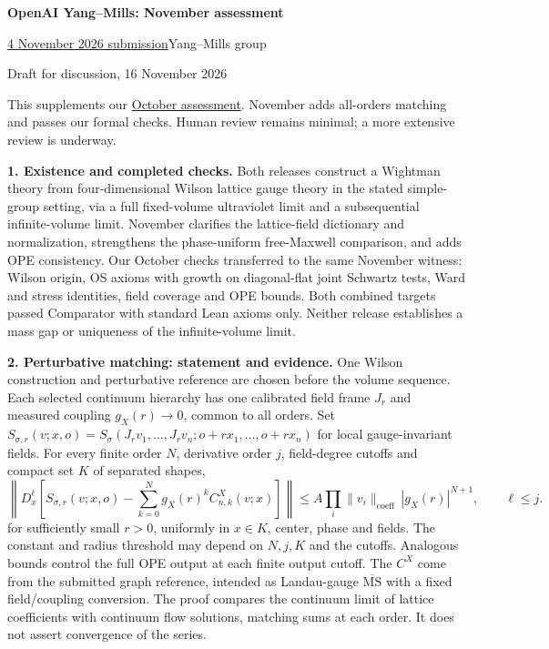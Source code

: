 \documentclass[11pt]{article}
\begin{document}
\begin{center}
{\Large\bfseries OpenAI Yang--Mills: November assessment}\par
\vspace{3pt}
\href{https://github.com/yang-mills-group/OpenAI-YM-20261104/tree/c1bb5a5566b2bad9d593980d470439f815895317/}{4 November 2026 submission}\quad\textbullet\quad Yang--Mills group\par
{\small Draft for discussion, 16 November 2026}
\end{center}
\vspace{-4pt}

This supplements our \href{https://github.com/yang-mills-group/YM/blob/main/docs/assessment-1.pdf}{October assessment}.
November adds all-orders matching and passes our formal checks.
Human review remains minimal; a more extensive review is underway.

\textbf{1. Existence and completed checks.}
Both releases construct a Wightman theory from four-dimensional Wilson lattice
gauge theory in the stated simple-group setting, via a full fixed-volume
ultraviolet limit and a subsequential infinite-volume limit. November clarifies
the lattice-field dictionary and normalization, strengthens the phase-uniform
free-Maxwell comparison, and adds OPE consistency.
Our October checks transferred to the same November witness: Wilson origin,
OS axioms with growth on diagonal-flat joint Schwartz tests, Ward and stress
identities, field coverage and OPE bounds. Both combined targets passed
Comparator with standard Lean axioms only. Neither release establishes a mass
gap or uniqueness of the infinite-volume limit.

\textbf{2. Perturbative matching: statement and evidence.}
One Wilson construction and perturbative reference are chosen before the
volume sequence. Each selected continuum hierarchy has one calibrated field
frame $J_r$ and measured coupling $g_X(r)\to0$, common to all orders. Set
$S_{\sigma,r}(v;x,o)=S_\sigma(J_rv_1,\ldots,J_rv_n;o+rx_1,\ldots,o+rx_n)$
for local gauge-invariant fields. For every finite order $N$, derivative order
$j$, field-degree cutoffs and compact set $K$ of separated shapes,
\[
 \left\|D_x^\ell\!\left[S_{\sigma,r}(v;x,o)
       -\sum_{k=0}^{N}g_X(r)^k C^X_{n,k}(v;x)\right]\right\|
 \le A\!\prod_i\|v_i\|_{\mathrm{coeff}}\,|g_X(r)|^{N+1},
 \qquad \ell\le j.
\]
for sufficiently small $r>0$, uniformly in $x\in K$, center, phase and fields.
The constant and radius threshold may depend on $N,j,K$ and the cutoffs.
Analogous bounds control the full OPE output at each finite output cutoff.
The $C^X$ come from the submitted graph reference, intended as Landau-gauge
$\overline{\mathrm{MS}}$ with a fixed field/coupling conversion. The proof compares the
continuum limit of lattice coefficients with continuum flow solutions,
matching sums at each order. It does not assert convergence of the series.
\end{document}
